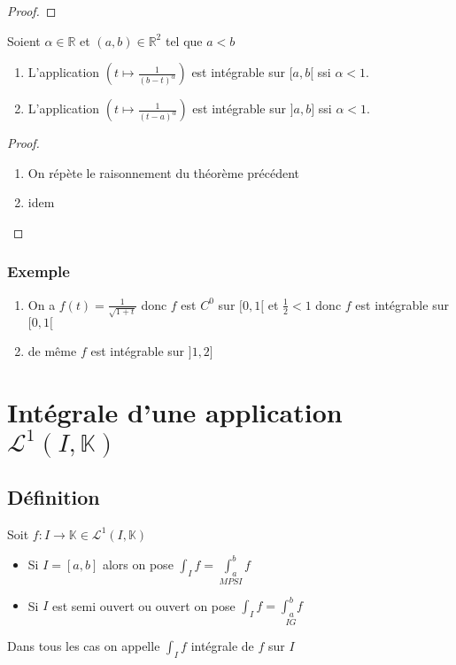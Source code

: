 \documentclass[11pt,hidelinks]{book}
\theoremstyle{mytheoremstyle}
\theoremstyle{mytheoremstyle}
\theoremstyle{mytheoremstyle}
\theoremstyle{mytheoremstyle}
\theoremstyle{mytheoremstyle}
\theoremstyle{mytheoremstyle}
\theoremstyle{mytheoremstyle}
\theoremstyle{mytheoremstyle}
\theoremstyle{myproblemstyle}
\def\mbb#1{\mathbb{#1}}
\def\mfc#1{\mathcal{#1}}
\def\bR{\mbb{R}}
\def\L{\mfc{L}^1(I,\bK)}
\def\bK{\mbb{K}}
\newcommand{\func}[3]{#1\colon#2\to#3}
\newcommand{\parenth}[1]{\left(#1\right)}
\begin{document}
\begin{adjustwidth}{-2em}{-1em}
\begin{theorem}
\begin{proof}
            \end{proof}
        \end{theorem}
        \begin{theorem}
            Soient $\alpha \in \bR$ et $(a,b) \in \bR^2$ tel que $a < b$  
            \begin{enumerate}
            \item L'application $\parenth{t \mapsto \frac{1}{(b-t)^{\alpha}}}$ est 
            intégrable sur $[a,b[$ ssi $\alpha < 1$. 
            \item L'application $\parenth{t \mapsto \frac{1}{(t-a)^{\alpha}}}$ est 
            intégrable sur $]a,b]$ ssi $\alpha < 1$.
            \end{enumerate}
            \begin{proof}
                \begin{enumerate}
                    \item On répète le raisonnement du théorème précédent 
                    \item idem 
                \end{enumerate}
            \end{proof}
        \end{theorem}
        \subsubsection{Exemple}
        \begin{ex}
            \begin{enumerate}
            \item On a $f(t) = \frac{1}{\sqrt{1 + t}}$ donc $f$ est $C^0$ sur $[0,1[$ 
            et $\frac{1}{2} < 1$ donc $f$ est intégrable sur $[0,1[$
            \item de même $f$ est intégrable sur $]1,2]$
        \end{enumerate}
        \end{ex}
        
    \end{adjustwidth}
    \section{Intégrale d'une application $\L$}
    \subsection{Définition}
        \begin{definition}
            Soit $\func{f}{I}{\bK} \in \L$
            \begin{itemize}[label=$\circ$] 
            \item Si $I = [a,b]$ alors on pose $\int_{I} f = \underset{MPSI}{\int_{a}^{b}} f$ 
            \item Si $I$ est semi ouvert ou ouvert on pose $\int_{I} f = \underset{IG}{\int_{a}^{b} f}$
            \end{itemize}
            Dans tous les cas on appelle $\int_{I} f$ intégrale de $f$ sur $I$ 
        \end{definition}
\end{document}
